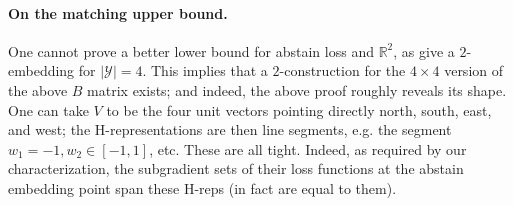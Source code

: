 \documentclass[anon,12pt]{colt2019}
\newcommand{\Comments}{1}
\newcommand{\mynote}[2]{\ifnum\Comments=1\textcolor{#1}{#2}\fi}
\newcommand{\jessie}[1]{\mynote{purple}{[JF: #1]}}
\newcommand{\reals}{\mathbb{R}}
\newcommand{\Y}{\mathcal{Y}}
\begin{document}
%
%
%
%
%
%
%

\paragraph{On the matching upper bound.}
One cannot prove a better lower bound for abstain loss and $\reals^2$, as \citet{ramaswamy2018consistent} give a $2$-embedding for $|\Y|=4$.
This implies that a $2$-construction for the $4 \times 4$ version of the above $B$ matrix exists; and indeed, the above proof roughly reveals its shape.
One can take $V$ to be the four unit vectors pointing directly north, south, east, and west; the H-representations are then line segments, e.g. the segment $w_1=-1, w_2 \in [-1,1]$, etc.
These are all tight.
Indeed, as required by our characterization, the subgradient sets of their loss functions at the abstain embedding point span these H-reps (in fact are equal to them).
\end{document}
